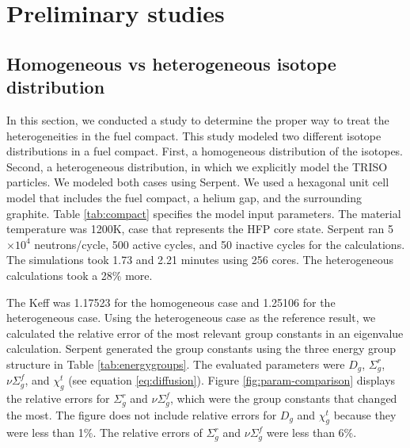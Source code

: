 \documentclass[11pt,letterpaper]{article}
\begin{document}
\section{Preliminary studies}

\subsection{Homogeneous vs heterogeneous isotope distribution}

In this section, we conducted a study to determine the proper way to treat the heterogeneities in the fuel compact.
This study modeled two different isotope distributions in a fuel compact.
First, a homogeneous distribution of the isotopes.
Second, a heterogeneous distribution, in which we explicitly model the TRISO particles.
We modeled both cases using Serpent.
We used a hexagonal unit cell model that includes the fuel compact, a helium gap, and the surrounding graphite.
Table \ref{tab:compact} specifies the model input parameters.
The material temperature was 1200K, case that represents the \gls{HFP} core state.
Serpent ran 5$\times 10^4$ neutrons/cycle, 500 active cycles, and 50 inactive cycles for the calculations.
The simulations took 1.73 and 2.21 minutes using 256 cores.
The heterogeneous calculations took a 28$\%$ more.

The \gls{Keff} was 1.17523 for the homogeneous case and 1.25106 for the heterogeneous case.
Using the heterogeneous case as the reference result, we calculated the relative error of the most relevant group constants in an eigenvalue calculation.
Serpent generated the group constants using the three energy group structure in Table \ref{tab:energygroups}.
The evaluated parameters were $D_g$, $\Sigma^r_g$, $\nu\Sigma^f_g$, and $\chi^t_g$ (see equation \ref{eq:diffusion}).
Figure \ref{fig:param-comparison} displays the relative errors for $\Sigma^r_g$ and $\nu\Sigma^f_g$, which were the group constants that changed the most.
The figure does not include relative errors for $D_g$ and $\chi^t_g$ because they were less than 1$\%$.
The relative errors of $\Sigma^r_g$ and $\nu\Sigma^f_g$ were less than 6$\%$.

\end{document}
